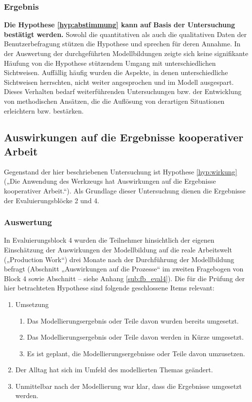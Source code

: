 \subsubsection{Ergebnis} 

\textbf{Die Hypothese \ref{hyp:abstimmung} kann auf Basis der Untersuchung bestätigt werden.} Sowohl die quantitativen als auch die qualitativen Daten der Benutzerbefragung stützen die Hypothese und sprechen für deren Annahme. In der Auswertung der durchgeführten Modellbildungen zeigte sich keine signifikante Häufung von die Hypothese stützendem Umgang mit unterschiedlichen Sichtweisen. Auffällig häufig wurden die Aspekte, in denen unterschiedliche Sichtweisen herrschten, nicht weiter angesprochen und im Modell ausgespart. Dieses Verhalten bedarf weiterführenden Untersuchungen bzw. der Entwicklung von methodischen Ansätzen, die die Auflösung von derartigen Situationen erleichtern bzw. bestärken.


\subsection{Auswirkungen auf die Ergebnisse kooperativer Arbeit} %
\label{sub:auswirkungen_auf_die_ergebnisse_kooperativer_arbeit}

Gegenstand der hier beschriebenen Untersuchung ist Hypothese \ref{hyp:wirkung} („Die Anwendung des Werkzeugs hat Auswirkungen auf die Ergebnisse kooperativer Arbeit.“). Als Grundlage dieser Untersuchung dienen die Ergebnisse der Evaluierungsblöcke 2 und 4.

\subsubsection{Auswertung} 

In Evaluierungsblock 4 wurden die Teilnehmer hinsichtlich der eigenen Einschätzung der Auswirkungen der Modellbildung auf die reale Arbeitswelt („Production Work“) drei Monate nach der Durchführung der Modellbildung befragt (Abschnitt „Auswirkungen auf die Prozesse“ im zweiten Fragebogen von Block 4 sowie Abschnitt  -- siehe Anhang \ref{sub:fb_eval4}). Die für die Prüfung der hier betrachteten Hypothese sind folgende geschlossene Items relevant:

\begin{enumerate}
	
	\item Umsetzung
		\begin{enumerate}
			\item Das Modellierungsergebnis oder Teile davon wurden bereits umgesetzt.
			\item Das Modellierungsergebnis oder Teile davon werden in Kürze umgesetzt.
			\item Es ist geplant, die Modellierungsergebnisse oder Teile davon umzusetzen.
		\end{enumerate}
	\item Der Alltag hat sich im Umfeld des modellierten Themas geändert.
	\item Unmittelbar nach der Modellierung war klar, dass die Ergebnisse umgesetzt werden.
\end{enumerate}

